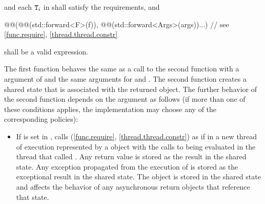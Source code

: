 \begin{itemdescr}
\pnum
\requires {} and each $\texttt{T}_i$ in  shall
satisfy the
 requirements, and
\begin{codeblock}
@@(@@(std::forward<F>(f)),
       @@(std::forward<Args>(args))...)     // see \ref{func.require}, \ref{thread.thread.constr}
\end{codeblock}
shall be a valid expression.

\pnum
\effects
The first function
behaves the same as a call to the second function with a  argument of
and the same arguments for  and .
The second function creates a shared state that is associated with
the returned  object.
The further behavior
of the second function depends on the  argument as follows (if
more than one of these conditions applies, the implementation may choose any of
the corresponding policies):

\begin{itemize}
\item
If  is set in , calls
(\ref{func.require}, \ref{thread.thread.constr})
as if in a new thread of execution represented by a  object
with the calls to  being evaluated in the thread that called .
Any return value
is stored as the result in the
shared state. Any exception propagated from
the execution of
is stored as the exceptional result in the shared state.
The  object is
stored in the shared state
and affects the behavior of any asynchronous return objects that
reference that state.


\end{itemize}
\end{itemdescr}
